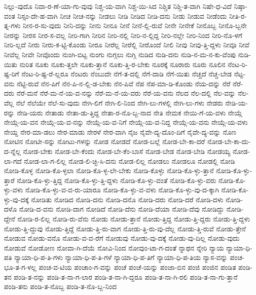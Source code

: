 {ನಿಲ್ಲು-ವುದೊ
ನಿವಾ-ರ-ಣೆ-ಯಾ-ಗು-ವುವು
ನಿಶ್ಚ-ಯ-ವಾಗಿ
ನಿಶ್ಚ-ಯಿ-ಸಿದ
ನಿಶ್ಚಿತ
ನಿಶ್ಚಿ-ತ-ವಾಗಿ
ನಿಷೇ-ಧ-ವಿದೆ
ನಿಷ್ಠಾ-ವಂತ
ನಿಸ್ಸಂ-ದೇ-ಹ-ವಾಗಿ
ನೀಚ
ನೀಚ-ನನ್ನು
ನೀಡಲು
ನೀಡಿ
ನೀಡಿದ
ನೀಡಿ-ದನು
ನೀಡು
ನೀಡುವ
ನೀಡೆಂದು
ನೀತಿ-ರ-ತ್ನ-ಗಳು
ನೀನ-ರ-ಸು-ವುದು
ನೀನಿ-ದನ್ನು
ನೀನು
ನೀನೂ
ನೀನೆ
ನೀನೆ-ಲ್ಲಿ-ರುವೆ
ನೀನೇ
ನೀನೇಕೆ
ನೀನೊಬ್ಬ
ನೀನೊ-ಬ್ಬನೇ
ನೀರನ್ನು
ನೀರಸ
ನೀರ-ಸ-ವಲ್ಲ
ನೀರಿ-ಗಾಗಿ
ನೀರಿನ
ನೀರಿ-ನಲ್ಲಿ
ನೀರಿ-ನ-ಲ್ಲಿದ್ದ
ನೀರಿ-ನಲ್ಲೇ
ನೀರಿ-ನಿಂದ
ನೀರಿ-ನೊ-ಳಗೆ
ನೀರಿ-ಲ್ಲದೆ
ನೀರು
ನೀರು-ಕ-ಟ್ಟಿ-ಕೊಂಡು
ನೀರೂ
ನೀರೆಲ್ಲ
ನೀರೆಲ್ಲಿ
ನೀರೊಂದೆ
ನೀಲಿ
ನೀವು
ನೀವು-ತ್ತಿ-ದ್ದಳು
ನೀವೂ
ನೀವೆ
ನೀವೆಲ್ಲ
ನೀವೇ
ನೀವೊಂದು
ನುಂಗಿ-ಬಿಟ್ಟ
ನುಂಗು
ನುಗ್ಗಲು
ನುಗ್ಗಿ
ನುಡಿದ
ನುಡಿ-ದನು
ನುಡಿ-ನ-ಮ-ನ-ಕು-ವೆಂಪು
ನುಡಿ-ಯಿತು
ನುರಿತ
ನೂಕು
ನೂಕು-ತ್ತಲೇ
ನೂಕು-ತ್ತಾನೆ
ನೂಕು-ತ್ತಿ-ರ-ಬೇಕು
ನೂರಕ್ಕೆ
ನೂರಾರು
ನೂರು
ನೂಲಿನ
ನೆಂಟ-ರಿ-ಷ್ಟ-ರಿಗೆ
ನೆಂಟ-ರಿ-ಷ್ಟ-ರೆ-ಲ್ಲರೂ
ನೆಂಟರು
ನೆಂಬುದೇ
ನೆಗೆ-ತ-ದಲ್ಲಿ
ನೆಗೆ-ದಾಡಿ
ನೆಗೆ-ಯಿತು
ನೆಚ್ಚದೆ
ನೆಚ್ಚ-ಬೇಡ
ನೆಟ್ಟ-ವನು
ನೆಟ್ಟಿ-ರುವೆ
ನೆನ-ಪಿಗೆ
ನೆನ-ಪಿ-ನ-ಲ್ಲಿ-ಡ-ಬೇಕು
ನೆನ-ಪಿವೆ
ನೆಪ
ನೆಪ-ಮಾ-ಡಿ-ಕೊಂಡು
ನೆಯ-ದನ್ನು
ನೆರೆ
ನೆರೆ-ದರು
ನೆರೆ-ಮನೆ
ನೆರೆ-ಮ-ನೆ-ಯ-ವ-ನನ್ನು
ನೆರೆ-ಮ-ನೆ-ಯ-ವರು
ನೆರೆ-ಯ-ವನು
ನೆಲದ
ನೆಲ-ದಲ್ಲಿ
ನೆಲ-ವನ್ನು
ನೆಲ-ವೆಲ್ಲ
ನೆಲೆ
ನೆಲೆಯೇ
ನೆಲೆ-ಸು-ವುದು
ನೇಗಿ-ಲಿಗೆ
ನೇಗಿ-ಲಿ-ನಿಂದ
ನೇಗಿ-ಲು-ಗಳಲ್ಲಿ
ನೇಗಿ-ಲು-ಗಳು
ನೇಡರು
ನೇಡಿ-ಯ-ರನ್ನು
ನೇಡಿ-ಯರು
ನೇತಾಡು
ನೇತಾ-ಡು-ತ್ತಿದ್ದ
ನೇತಾ-ರ-ನೊ-ಬ್ಬ-ನಾದ
ನೇತಿ
ನೇಮಕ
ನೇಯಿ-ಗೆ-ಯ-ವಳು
ನೇಯ್ಗೆ
ನೇಯ್ಗೆ-ಯ-ವನ
ನೇಯ್ಗೆ-ಯ-ವ-ನನ್ನು
ನೇಯ್ಗೆ-ಯ-ವ-ನಿಗೆ
ನೇಯ್ಗೆ-ಯ-ವ-ನಿದ್ದ
ನೇಯ್ಗೆ-ಯ-ವನು
ನೇಯ್ಗೆ-ಯ-ವಳು
ನೇಯ್ದ
ನೇರ-ಮಾ-ಡಲು
ನೇರ-ಮಾಡು
ನೇರಳೆ
ನೇರ-ವಾಗಿ
ನೈಜ
ನೈವೇ-ದ್ಯ-ದೊಂ-ದಿಗೆ
ನೈವೇ-ದ್ಯ-ವನ್ನು
ನೊಣ
ನೋಟಿನ
ನೋಟೀ-ಸನ್ನು
ನೋಟು-ಗಳನ್ನು
ನೋಡ
ನೋಡದೆ
ನೋಡ-ಬಲ್ಲೆ
ನೋಡ-ಬೇ-ಕಾ-ದರೆ
ನೋಡ-ಬೇ-ಕಾ-ದು-ದ-ನ್ನೆಲ್ಲ
ನೋಡ-ಬೇಕು
ನೋಡ-ಬೇ-ಕೆಂದು
ನೋಡ-ಬೇ-ಕೆಂ-ಬಾಸೆ
ನೋಡ-ಬೇಡ
ನೋಡ-ಬೇಡಿ
ನೋಡಯ್ಯ
ನೋಡ-ಲಾ-ಗದೆ
ನೋಡ-ಲಾ-ಗ-ಲಿಲ್ಲ
ನೋಡ-ಲಿ-ಚ್ಛಿ-ಸಿ-ದನು
ನೋಡ-ಲಿಲ್ಲ
ನೋಡಲು
ನೋಡಲೂ
ನೋಡಲ್ಲಿ
ನೋಡಿ
ನೋಡಿ-ಕೊಳ್ಳ
ನೋಡಿ-ಕೊ-ಳ್ಳಲಾ
ನೋಡಿ-ಕೊ-ಳ್ಳ-ಲೇ-ಬೇಕು
ನೋಡಿ-ಕೊಳ್ಳು
ನೋಡಿ-ಕೊ-ಳ್ಳು-ತ್ತಾನೆ
ನೋಡಿ-ಕೊ-ಳ್ಳು-ತ್ತಾರೆ
ನೋಡಿ-ಕೊ-ಳ್ಳು-ತ್ತಿದ್ದ
ನೋಡಿ-ಕೊ-ಳ್ಳು-ತ್ತಿ-ದ್ದಳು
ನೋಡಿ-ಕೊ-ಳ್ಳು-ವಂತೆ
ನೋಡಿ-ಕೊ-ಳ್ಳು-ವರು
ನೋಡಿ-ಕೊ-ಳ್ಳು-ವಳು
ನೋಡಿ-ಕೊ-ಳ್ಳು-ವ-ವ-ರು-ಯಾರೂ
ನೋಡಿ-ಕೊ-ಳ್ಳು-ವ-ವಳು
ನೋಡಿ-ಕೊ-ಳ್ಳು-ವು-ದ-ಕ್ಕಾಗಿ
ನೋಡಿ-ಕೊ-ಳ್ಳು-ವು-ದಕ್ಕೆ
ನೋಡಿತು
ನೋಡಿದ
ನೋಡಿ-ದನು
ನೋಡಿ-ದನೊ
ನೋಡಿ-ದರು
ನೋಡಿ-ದರೆ
ನೋಡಿ-ದಳು
ನೋಡಿ-ದಳೊ
ನೋಡಿ-ದ-ವನು
ನೋಡಿ-ದಾಗ
ನೋಡಿದೆ
ನೋಡಿ-ದೆನು
ನೋಡಿ-ದೆಯಾ
ನೋಡಿ-ದೆವು
ನೋಡಿದ್ದು
ನೋಡಿ-ದ್ದೇನೆ
ನೋಡಿ-ರ-ಲಿಲ್ಲ
ನೋಡಿ-ರು-ವೆನು
ನೋಡು
ನೋಡು-ತ್ತಾನೆ
ನೋಡು-ತ್ತಿದ್ದ
ನೋಡು-ತ್ತಿ-ದ್ದರು
ನೋಡು-ತ್ತಿ-ದ್ದಳು
ನೋಡು-ತ್ತಿ-ದ್ದುವು
ನೋಡು-ತ್ತಿದ್ದೆ
ನೋಡು-ತ್ತಿ-ರು-ವಾಗ
ನೋಡು-ತ್ತಿ-ರು-ವು-ದೆಲ್ಲ
ನೋಡು-ತ್ತಿ-ರುವೆ
ನೋಡು-ತ್ತೇನೆ
ನೋಡುವ
ನೋಡು-ವನೊ
ನೋಡು-ವ-ವ-ರೆಗೆ
ನೋಡುವು
ನೋಡು-ವು-ದಕ್ಕೆ
ನೋಡು-ವು-ದಿಲ್ಲ
ನೋಡು-ವುದು
ನೋಡುವೆ
ನೋಡೋಣ
ನೋವಾ-ಗಿ-ದೆಯೆ
ನೋವಿ-ನಿಂದ
ನೋವುಂ-ಟಾ-ಗ-ದಂತೆ
ನ್ನಾಥನ
ನ್ನೇರಿ
ನ್ಯಾಯ
ನ್ಯಾಯಾ-ಧಿ-ಪತಿ
ನ್ಯಾಯಾ-ಧಿ-ಪ-ತಿ-ಗಳು
ನ್ಯಾಯಾ-ಧಿ-ಪ-ತಿ-ಗಳೆ
ನ್ಯಾಯಾ-ಧಿ-ಪ-ತಿಗೆ
ನ್ಯಾಯಾ-ಧಿ-ಪ-ತಿಯ
ನ್ಯಾಸ-ವನ್ನು
ಪಂಚ-ಭೂ-ತ-ಗ-ಳಲ್ಲ
ಪಂಚ-ವ-ಟಿಯ
ಪಂಚಾಂ-ಗ-ವನ್ನು
ಪಂಚೆ
ಪಂಚೆ-ಯನ್ನು
ಪಂಜಾ-ಬಿನ
ಪಂಜಿ
ಪಂಜಿನ
ಪಂಡಿತ
ಪಂಡಿ-ತನ
ಪಂಡಿ-ತ-ನನ್ನು
ಪಂಡಿ-ತ-ನಾ-ಗ-ಲಾರ
ಪಂಡಿ-ತ-ನಾ-ಗಿ-ದ್ದರೂ
ಪಂಡಿ-ತ-ನಾ-ಗಿ-ರಲಿ
ಪಂಡಿ-ತ-ನಾ-ಗು-ತ್ತಾನೆ
ಪಂಡಿ-ತನು
ಪಂಡಿ-ತ-ನೊಬ್ಬ
ಪಂಡಿ-ತ-ನೊ-ಬ್ಬ-ನಿಂದ
}
